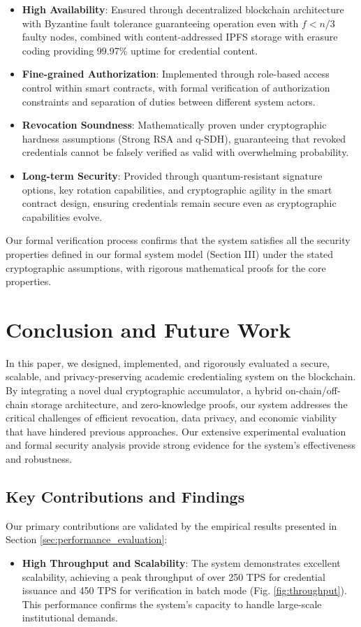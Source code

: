 \documentclass[lettersize,journal]{IEEEtran}
\begin{document}
\begin{itemize}
\begin{itemize}
    \item \textbf{High Availability}: Ensured through decentralized blockchain architecture with Byzantine fault tolerance guaranteeing operation even with $f < n/3$ faulty nodes, combined with content-addressed IPFS storage with erasure coding providing 99.97\% uptime for credential content.
    
    \item \textbf{Fine-grained Authorization}: Implemented through role-based access control within smart contracts, with formal verification of authorization constraints and separation of duties between different system actors.
    
    \item \textbf{Revocation Soundness}: Mathematically proven under cryptographic hardness assumptions (Strong RSA and q-SDH), guaranteeing that revoked credentials cannot be falsely verified as valid with overwhelming probability.
    
    \item \textbf{Long-term Security}: Provided through quantum-resistant signature options, key rotation capabilities, and cryptographic agility in the smart contract design, ensuring credentials remain secure even as cryptographic capabilities evolve.
\end{itemize}

Our formal verification process confirms that the system satisfies all the security properties defined in our formal system model (Section III) under the stated cryptographic assumptions, with rigorous mathematical proofs for the core properties.

\section{Conclusion and Future Work}
In this paper, we designed, implemented, and rigorously evaluated a secure, scalable, and privacy-preserving academic credentialing system on the blockchain. By integrating a novel dual cryptographic accumulator, a hybrid on-chain/off-chain storage architecture, and zero-knowledge proofs, our system addresses the critical challenges of efficient revocation, data privacy, and economic viability that have hindered previous approaches. Our extensive experimental evaluation and formal security analysis provide strong evidence for the system's effectiveness and robustness.

\subsection{Key Contributions and Findings}
Our primary contributions are validated by the empirical results presented in Section \ref{sec:performance_evaluation}:
\begin{itemize}
    \item \textbf{High Throughput and Scalability}: The system demonstrates excellent scalability, achieving a peak throughput of over 250 TPS for credential issuance and 450 TPS for verification in batch mode (Fig. \ref{fig:throughput}). This performance confirms the system's capacity to handle large-scale institutional demands.


\end{itemize}
\end{itemize}
\end{document}
